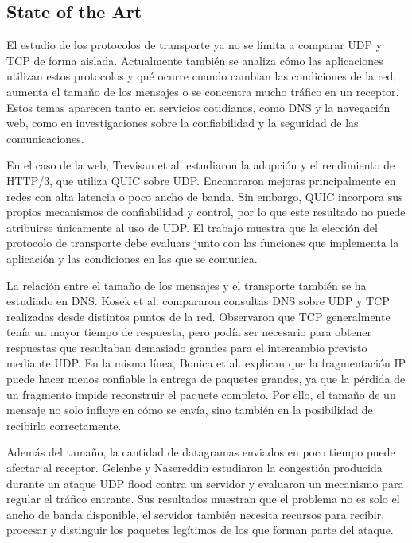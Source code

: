 
\subsection{State of the Art}
El estudio de los protocolos de transporte ya no se limita a comparar UDP y TCP de forma aislada. Actualmente también se analiza cómo las aplicaciones utilizan estos protocolos y qué ocurre cuando cambian las condiciones de la red, aumenta el tamaño de los mensajes o se concentra mucho tráfico en un receptor. Estos temas aparecen tanto en servicios cotidianos, como DNS y la navegación web, como en investigaciones sobre la confiabilidad y la seguridad de las comunicaciones.

En el caso de la web, Trevisan et al. \cite{trevisan2021http3} estudiaron la adopción y el rendimiento de HTTP/3, que utiliza QUIC sobre UDP. Encontraron mejoras principalmente en redes con alta latencia o poco ancho de banda. Sin embargo, QUIC incorpora sus propios mecanismos de confiabilidad y control, por lo que este resultado no puede atribuirse únicamente al uso de UDP. El trabajo muestra que la elección del protocolo de transporte debe evaluars junto con las funciones que implementa la aplicación y las condiciones en las que se comunica.

La relación entre el tamaño de los mensajes y el transporte también se ha estudiado en DNS. Kosek et al. \cite{kosek2022dns} compararon consultas DNS sobre UDP y TCP realizadas desde distintos puntos de la red. Observaron que TCP generalmente tenía un mayor tiempo de respuesta, pero podía ser necesario para obtener respuestas que resultaban demasiado grandes para el intercambio previsto mediante UDP. En la misma línea, Bonica et al. \cite{rfc8900} explican que la fragmentación IP puede hacer menos confiable la entrega de paquetes grandes, ya que la pérdida de un fragmento impide reconstruir el paquete completo. Por ello, el tamaño de un mensaje no solo influye en cómo se envía, sino también en la posibilidad de recibirlo correctamente.

Además del tamaño, la cantidad de datagramas enviados en poco tiempo puede afectar al receptor. Gelenbe y Nasereddin \cite{gelenbe2023flood} estudiaron la congestión producida durante un ataque UDP flood contra un servidor y evaluaron un mecanismo para regular el tráfico entrante. Sus resultados muestran que el problema no es solo el ancho de banda disponible, el servidor también necesita recursos para recibir, procesar y distinguir los paquetes legítimos de los que forman parte del ataque.